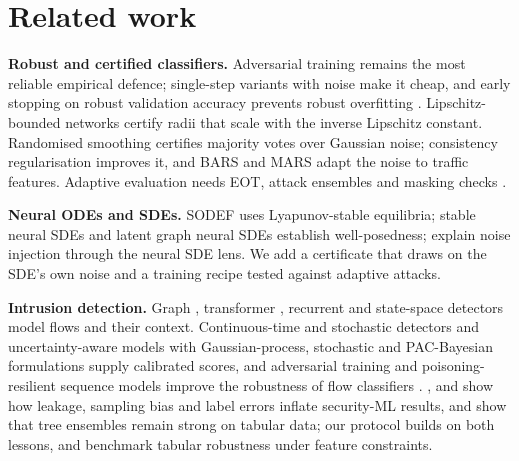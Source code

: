 \section{Related work}\label{sec:related}
\textbf{Robust and certified classifiers.} Adversarial training
\citep{madry2018pgd,zhang2019trades} remains the most reliable empirical
defence; single-step variants with noise \citep{dejorge2022nfgsm} make it
cheap, and early stopping on robust validation accuracy prevents robust
overfitting \citep{rice2020overfitting}. Lipschitz-bounded networks
\citep{tsuzuku2018lipschitz,anil2019sorting,araujo2023sll} certify radii that
scale with the inverse Lipschitz constant. Randomised smoothing
\citep{cohen2019smoothing,salman2019smoothadv,yang2020smoothing} certifies
majority votes over Gaussian noise; consistency regularisation
\citep{jeong2020consistency} improves it, and BARS \citep{wang2023bars} and
MARS \citep{huang2025mars} adapt the noise to traffic features. Adaptive
evaluation needs EOT, attack ensembles and masking checks
\citep{athalye2018obfuscated,croce2020autoattack,carlini2019evaluating}.

\textbf{Neural ODEs and SDEs.} SODEF \citep{kang2021sodef} uses Lyapunov-stable
equilibria; stable neural SDEs \citep{oh2024stablesde} and latent graph neural
SDEs \citep{bergna2024lgnsde} establish well-posedness;
\citet{liu2020sdenoise} explain noise injection through the neural SDE lens. We
add a certificate that draws on the SDE's own noise and a training recipe tested
against adaptive attacks.

\textbf{Intrusion detection.} Graph \citep{lo2022egraphsage}, transformer
\citep{wu2022rtids}, recurrent \citep{halbouni2022cnnlstm} and state-space
\citep{benatitallah2026graphmamba} detectors model flows and their context.
Continuous-time and stochastic detectors
\citep{anaedevha2026ode,anaedevha2026mstgnn,anaedevha2026mstgnntia,anaedevha2026fokker,anaedevha2026estc}
and uncertainty-aware models with Gaussian-process, stochastic and PAC-Bayesian
formulations \citep{anaedevha2026hgp,anaedevha2025stochtx,anaedevha2026pacbayes}
supply calibrated scores, and adversarial training and poisoning-resilient
sequence models improve the robustness of flow classifiers
\citep{anaedevha2024robust,anaedevha2026mambashield,anaedevha2026pqidps}.
\citet{arp2022dos}, \citet{pendlebury2019tesseract} and
\citet{engelen2021troubleshooting} show how leakage, sampling bias and label
errors inflate security-ML results, and \citet{grinsztajn2022trees} show that
tree ensembles remain strong on tabular data; our protocol builds on both
lessons, and \citet{simonetto2024tabularbench} benchmark tabular robustness
under feature constraints.

